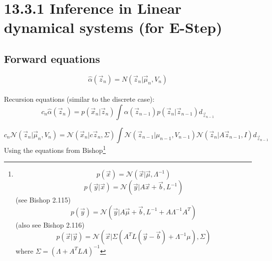 \documentclass[11pt]{article}
\begin{document}
\section{13.3.1 Inference in Linear dynamical systems (for E-Step)}
\subsection{Forward equations}
\[\hat{\alpha}(\vec{z}_n) = N( \vec{z}_n |\vec{\mu}_n,V_n)\] \\
Recursion equations (similar to the discrete case):
\[c_n\hat{\alpha}(\vec{z}_n)= p(\vec{x}_n|\vec{z}_n) \int\alpha(\vec{z}_{n-1})p(\vec{z}_n|\vec{z}_{n-1})d_{\vec{z}_{n-1}}\]

\[c_n\mathcal{N}(\vec{z}_n|\vec{\mu}_n,V_n)=\mathcal{N}(\vec{x}_n|c\vec{z}_n,\Sigma) \int\mathcal{N}(\vec{z}_{n-1}|\mu_{n-1},V_{n-1})\mathcal{N}(\vec{z}_n|A\vec{z}_{n-1},I)d_{\vec{z}_{n-1}}\]
Using the equations from Bishop\footnote{
\[p(\vec{x}) = \mathcal{N}(\vec{x}|\vec{\mu},\Lambda^{-1})\]
\[p(\vec{y}|\vec{x}) = \mathcal{N}(\vec{y}|A\vec{x}+\vec{b},L^{-1})\]
(see Bishop 2.115)
\[p(\vec{y}) = \mathcal{N}(\vec{y}|A\vec{\mu}+\vec{b},L^{-1}+A\Lambda^{-1}A^T)\]
(also see Bishop 2.116)
\[p(\vec{x}|\vec{y}) = \mathcal{N}(\vec{x}|\Sigma(A^T L (\vec{y} - \vec{b}) + \Lambda^{-1}\mu), \Sigma)\]
where $\Sigma = (\Lambda + A^TLA)^{-1}$
}
\end{document}
